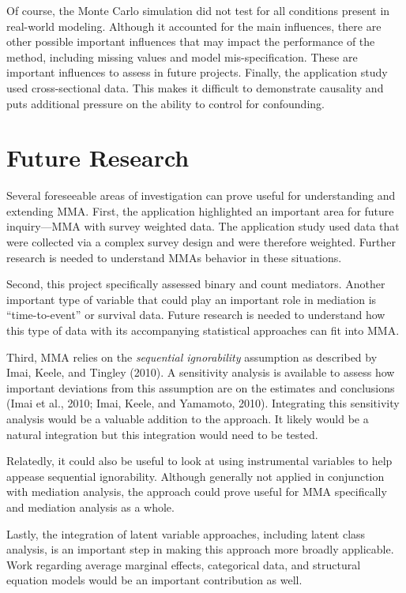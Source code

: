 \documentclass[]{DissertateUSU}
\begin{document}
Of course, the Monte Carlo simulation did not test for all conditions
present in real-world modeling. Although it accounted for the main
influences, there are other possible important influences that may
impact the performance of the method, including missing values and model
mis-specification. These are important influences to assess in future
projects. Finally, the application study used cross-sectional data. This
makes it difficult to demonstrate causality and puts additional pressure
on the ability to control for confounding.

\section{Future Research}\label{future-research}

Several foreseeable areas of investigation can prove useful for
understanding and extending MMA. First, the application highlighted an
important area for future inquiry---MMA with survey weighted data. The
application study used data that were collected via a complex survey
design and were therefore weighted. Further research is needed to
understand MMAs behavior in these situations.

Second, this project specifically assessed binary and count mediators.
Another important type of variable that could play an important role in
mediation is ``time-to-event'' or survival data. Future research is
needed to understand how this type of data with its accompanying
statistical approaches can fit into MMA.

Third, MMA relies on the \emph{sequential ignorability} assumption as
described by Imai, Keele, and Tingley (2010). A sensitivity analysis is
available to assess how important deviations from this assumption are on
the estimates and conclusions (Imai et al., 2010; Imai, Keele, and
Yamamoto, 2010). Integrating this sensitivity analysis would be a
valuable addition to the approach. It likely would be a natural
integration but this integration would need to be tested.

Relatedly, it could also be useful to look at using instrumental
variables to help appease sequential ignorability. Although generally
not applied in conjunction with mediation analysis, the approach could
prove useful for MMA specifically and mediation analysis as a whole.

Lastly, the integration of latent variable approaches, including latent
class analysis, is an important step in making this approach more
broadly applicable. Work regarding average marginal effects, categorical
data, and structural equation models would be an important contribution
as well.
\end{document}
